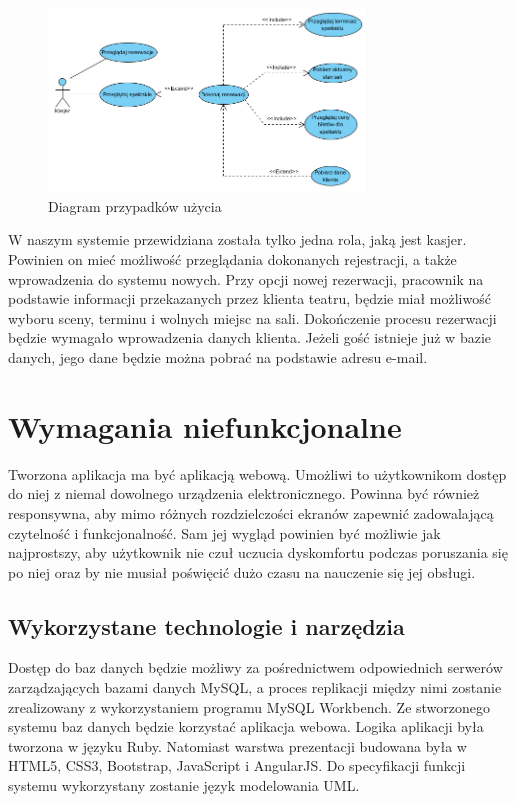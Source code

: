 \documentclass{mgr}
\begin{document}
\begin{figure}[!ht]
	\centering
	\includegraphics[width=0.75\textwidth]{images/diagram_pu.png}
	\caption{Diagram przypadków użycia}
	\label{fig:diagram_pu}
\end{figure}

W naszym systemie przewidziana została tylko jedna rola, jaką jest kasjer. Powinien on mieć możliwość przeglądania dokonanych rejestracji, a także wprowadzenia do systemu nowych. Przy opcji nowej rezerwacji, pracownik na podstawie informacji przekazanych przez klienta teatru, będzie miał możliwość wyboru sceny, terminu i wolnych miejsc na sali. Dokończenie procesu rezerwacji będzie wymagało wprowadzenia danych klienta. Jeżeli gość istnieje już w bazie danych, jego dane będzie można pobrać na podstawie adresu e-mail.

\section{Wymagania niefunkcjonalne}
Tworzona aplikacja ma być aplikacją webową. Umożliwi to użytkownikom dostęp do niej z niemal dowolnego urządzenia elektronicznego. Powinna być również responsywna, aby mimo różnych rozdzielczości ekranów zapewnić zadowalającą czytelność i funkcjonalność. Sam jej wygląd powinien być możliwie jak najprostszy, aby użytkownik nie czuł uczucia dyskomfortu podczas poruszania się po niej oraz by nie musiał poświęcić dużo czasu na nauczenie się jej obsługi.

\subsection{Wykorzystane technologie i narzędzia}
Dostęp  do  baz  danych  będzie  możliwy  za  pośrednictwem  odpowiednich  serwerów zarządzających bazami danych MySQL, a proces replikacji między nimi zostanie zrealizowany z wykorzystaniem programu MySQL Workbench. Ze stworzonego systemu baz danych będzie korzystać aplikacja webowa. Logika aplikacji była tworzona w języku Ruby. Natomiast warstwa prezentacji budowana była w HTML5, CSS3, Bootstrap, JavaScript i AngularJS. Do  specyfikacji  funkcji systemu wykorzystany zostanie język modelowania UML.
\end{document}
